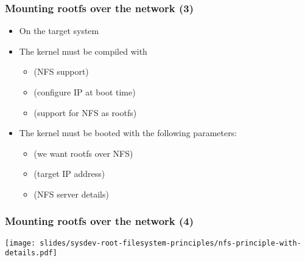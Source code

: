 {\begin{frame}
  \frametitle{Mounting rootfs over the network (3)}
  \begin{itemize}
  \item On the target system
  \item The kernel must be compiled with
    \begin{itemize}
    \item {} (NFS support)
    \item {} (configure IP at boot time)
    \item {} (support for NFS as rootfs)
    \end{itemize}
  \item The kernel must be booted with the following parameters:
    \begin{itemize}
    \item {} (we want rootfs over NFS)
    \item {} (target IP address)
    \item {} (NFS server details)
    \end{itemize}
  \end{itemize}
\end{frame}

\begin{frame}
  \frametitle{Mounting rootfs over the network (4)}
  \begin{center}
    \texttt{[image: slides/sysdev-root-filesystem-principles/nfs-principle-with-details.pdf]}
  \end{center}
\end{frame}
}
